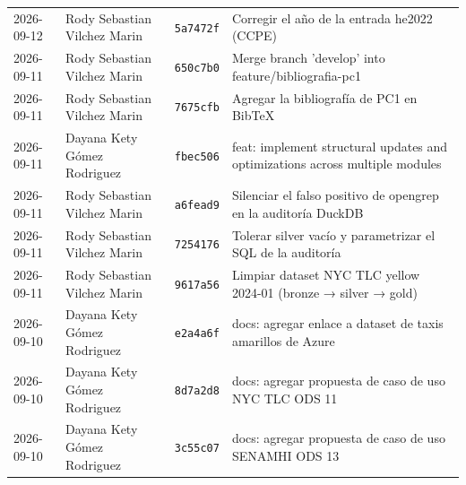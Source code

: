 {\begin{xltabular}{\textwidth}{@{}L{2cm}L{2.9cm}L{1.5cm}Y@{}}
2026-09-12 & Rody Sebastian Vilchez Marin & \texttt{5a7472f} & Corregir el año de la entrada he2022 (CCPE) \\
2026-09-11 & Rody Sebastian Vilchez Marin & \texttt{650c7b0} & Merge branch 'develop' into feature/bibliografia-pc1 \\
2026-09-11 & Rody Sebastian Vilchez Marin & \texttt{7675cfb} & Agregar la bibliografía de PC1 en BibTeX \\
2026-09-11 & Dayana Kety Gómez Rodriguez & \texttt{fbec506} & feat: implement structural updates and optimizations across multiple modules \\
2026-09-11 & Rody Sebastian Vilchez Marin & \texttt{a6fead9} & Silenciar el falso positivo de opengrep en la auditoría DuckDB \\
2026-09-11 & Rody Sebastian Vilchez Marin & \texttt{7254176} & Tolerar silver vacío y parametrizar el SQL de la auditoría \\
2026-09-11 & Rody Sebastian Vilchez Marin & \texttt{9617a56} & Limpiar dataset NYC TLC yellow 2024-01 (bronze → silver → gold) \\
2026-09-10 & Dayana Kety Gómez Rodriguez & \texttt{e2a4a6f} & docs: agregar enlace a dataset de taxis amarillos de Azure \\
2026-09-10 & Dayana Kety Gómez Rodriguez & \texttt{8d7a2d8} & docs: agregar propuesta de caso de uso NYC TLC ODS 11 \\
2026-09-10 & Dayana Kety Gómez Rodriguez & \texttt{3c55c07} & docs: agregar propuesta de caso de uso SENAMHI ODS 13 \\
\end{xltabular}
}
